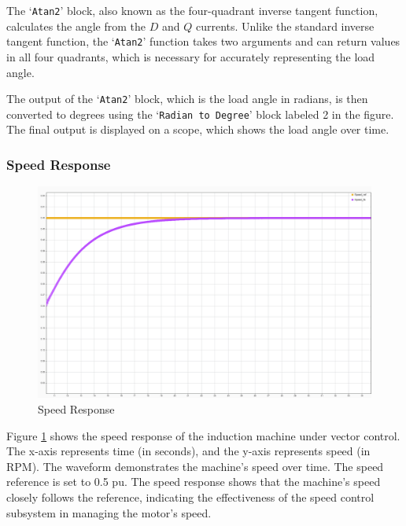 The `\texttt{Atan2}' block, also known as the four-quadrant inverse tangent function, calculates the angle from the $D$ and $Q$ currents. Unlike the standard inverse tangent function, the `\texttt{Atan2}' function takes two arguments and can return values in all four quadrants, which is necessary for accurately representing the load angle.

The output of the `\texttt{Atan2}' block, which is the load angle in radians, is then converted to degrees using the `\texttt{Radian to Degree}' block labeled 2 in the figure. The final output is displayed on a scope, which shows the load angle over time.




\subsubsection{Speed Response}

\begin{figure}[H]
	\centering
	\includegraphics[width=6in]{sections/section3/images/simulationResutls/SpeedTrackingNoCursor.png}
	\caption{Speed Response}
	\label{fig:speed_response}
\end{figure}

Figure \ref{fig:speed_response} shows the speed response of the induction machine under vector control. The x-axis represents time (in seconds), and the y-axis represents speed (in RPM). The waveform demonstrates the machine's speed over time. The speed reference is set to 0.5 pu. The speed response shows that the machine's speed closely follows the reference, indicating the effectiveness of the speed control subsystem in managing the motor's speed.



